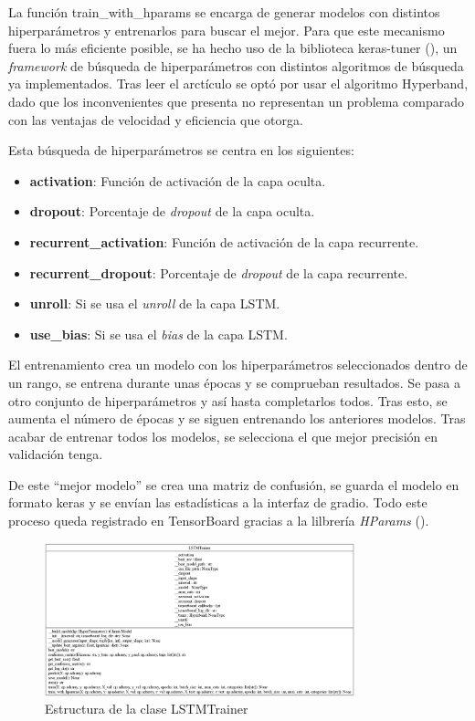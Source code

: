 La función train\_with\_hparams se encarga de generar modelos con distintos hiperparámetros y entrenarlos para buscar el mejor. Para que este mecanismo fuera lo más eficiente posible, se ha hecho uso de la biblioteca keras-tuner (\cite{omalley2019kerastuner}), un \textit{framework} de búsqueda de hiperparámetros con distintos algoritmos de búsqueda ya implementados. Tras leer el arctículo \cite{li2018hyperbandnovelbanditbasedapproach} se optó por usar el algoritmo Hyperband, dado que los inconvenientes que presenta no representan un problema comparado con las ventajas de velocidad y eficiencia que otorga.

Esta búsqueda de hiperparámetros se centra en los siguientes:
\begin{itemize}
    \item \textbf{activation}: Función de activación de la capa oculta.
    \item \textbf{dropout}: Porcentaje de \textit{dropout} de la capa oculta.
    \item \textbf{recurrent\_activation}: Función de activación de la capa recurrente.
    \item \textbf{recurrent\_dropout}: Porcentaje de \textit{dropout} de la capa recurrente.
    \item \textbf{unroll}: Si se usa el \textit{unroll} de la capa LSTM.
    \item \textbf{use\_bias}: Si se usa el \textit{bias} de la capa LSTM.
\end{itemize}

El entrenamiento crea un modelo con los hiperparámetros seleccionados dentro de un rango, se entrena durante unas épocas y se comprueban resultados. Se pasa a otro conjunto de hiperparámetros y así hasta completarlos todos. Tras esto, se aumenta el número de épocas y se siguen entrenando los anteriores modelos. Tras acabar de entrenar todos los modelos, se selecciona el que mejor precisión en validación tenga.

De este ``mejor modelo'' se crea una matriz de confusión, se guarda el modelo en formato keras y se envían las estadísticas a la interfaz de gradio. Todo este proceso queda registrado en TensorBoard gracias a la lilbrería \textit{HParams} (\cite{hparams}).

\begin{figure}[H]
    \centering
    \includegraphics[width=0.8\textwidth]{Imagenes/Bitmap/classes_LSTMTrainer.png}
    \caption{Estructura de la clase LSTMTrainer}
    \label{fig:lstm-estructura}
\end{figure}

